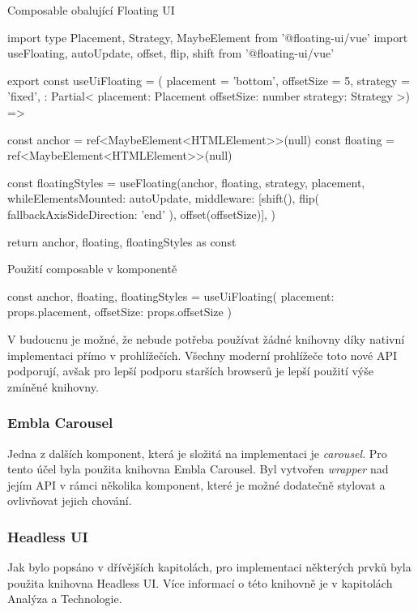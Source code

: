 \begin{listing}[H]
    \caption{Composable obalující Floating UI}
    \label{lst:floating-ui}
    \begin{code}
import type { Placement, Strategy, MaybeElement } from '@floating-ui/vue'
import { useFloating, autoUpdate, offset, flip, shift } from '@floating-ui/vue'

export const useUiFloating = ({
  placement = 'bottom',
  offsetSize = 5,
  strategy = 'fixed',
}: Partial<{
  placement: Placement
  offsetSize: number
  strategy: Strategy
}>) => {
  const anchor = ref<MaybeElement<HTMLElement>>(null)
  const floating = ref<MaybeElement<HTMLElement>>(null)

  const { floatingStyles } = useFloating(anchor, floating, {
    strategy,
    placement,
    whileElementsMounted: autoUpdate,
    middleware: [shift(), flip({ fallbackAxisSideDirection: 'end' }), offset(offsetSize)],
  })

  return { anchor, floating, floatingStyles } as const
}
\end{code}
\end{listing}

\begin{listing}[H]
    \caption{Použití composable v komponentě}
    \label{lst:floating-ui-usage}
    \begin{code}
const { anchor, floating, floatingStyles } = useUiFloating({ placement: props.placement, offsetSize: props.offsetSize })
\end{code}
\end{listing}

V budoucnu je možné, že nebude potřeba používat žádné knihovny díky nativní implementaci přímo v prohlížečích. Všechny moderní prohlížeče toto nové API podporují, avšak pro lepší podporu starších browserů je lepší použití výše zmíněné knihovny. \cite{PopoverAPI}

\subsubsection{Embla Carousel}
Jedna z dalších komponent, která je složitá na implementaci je \emph{carousel}. Pro tento účel byla použita knihovna Embla Carousel. Byl vytvořen \emph{wrapper} nad jejím API v rámci několika komponent, které je možné dodatečně stylovat a ovlivňovat jejich chování.

\subsubsection{Headless UI}
Jak bylo popsáno v dřívějších kapitolách, pro implementaci některých prvků byla použita knihovna Headless UI. Více informací o této knihovně je v kapitolách Analýza a Technologie.

